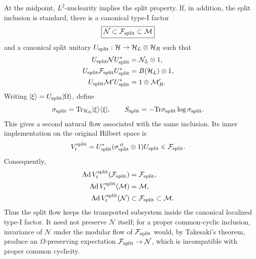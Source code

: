\documentclass[a4paper,11pt]{article}
\theoremstyle{definition}
\newcommand{\Tr}{\text{Tr}}
\newcommand{\mN}{\mathcal{N}}
\newcommand{\mM}{\mathcal{M}}
\newcommand{\Ad}{\operatorname{Ad}}
\begin{document}
At the midpoint, $L^2$-nuclearity implies the split property. If, in addition,
the split inclusion is standard, there is a canonical type-I factor
\begin{equation}
    \boxed{
    \mN\subset\mathcal F_{\rm split}\subset\mM
    }
    \label{eq:canonical-split-factor}
\end{equation}
and a canonical split unitary
$U_{\rm split}:\mathcal H\to\mathcal H_L\otimes\mathcal H_R$ such that
\begin{align}
    U_{\rm split}\mN U_{\rm split}^*
    &=\mN_L\otimes1, \nonumber\\
    U_{\rm split}\mathcal F_{\rm split}U_{\rm split}^*
    &=B(\mathcal H_L)\otimes1, \nonumber\\
    U_{\rm split}\mM'U_{\rm split}^*
    &=1\otimes\mM_R'.
    \label{eq:canonical-split-representation}
\end{align}
Writing $|\xi\rangle=U_{\rm split}|\Omega\rangle$, define
\begin{equation}
    \sigma_{\rm split}
    =\Tr_{\mathcal H_R}|\xi\rangle\langle\xi|,
    \qquad
    S_{\rm split}=-\Tr\sigma_{\rm split}\log\sigma_{\rm split}.
    \label{eq:sigma-split-definition}
\end{equation}
This gives a second natural flow associated with the same inclusion. Its inner
implementation on the original Hilbert space is
\begin{equation}
    V_t^{\rm split}
    =U_{\rm split}^*
      (\sigma_{\rm split}^{\,it}\otimes1)
      U_{\rm split}
    \in\mathcal F_{\rm split}.
    \label{eq:split-inner-dynamics}
\end{equation}
Consequently,
\begin{align}
    \Ad V_t^{\rm split}(\mathcal F_{\rm split})
    &=\mathcal F_{\rm split}, \nonumber\\
    \Ad V_t^{\rm split}(\mM)&=\mM, \nonumber\\
    \Ad V_t^{\rm split}(\mN)
    &\subset\mathcal F_{\rm split}\subset\mM.
    \label{eq:split-dynamics-localized}
\end{align}
Thus the split flow keeps the transported subsystem inside the canonical
localized type-I factor. It need not preserve $\mN$ itself; for a
proper common-cyclic inclusion, invariance of $\mN$ under the modular
flow of $\mathcal F_{\rm split}$ would, by Takesaki's theorem, produce an
$\Omega$-preserving expectation $\mathcal F_{\rm split}\to\mN$, which
is incompatible with proper common cyclicity.
\end{document}
